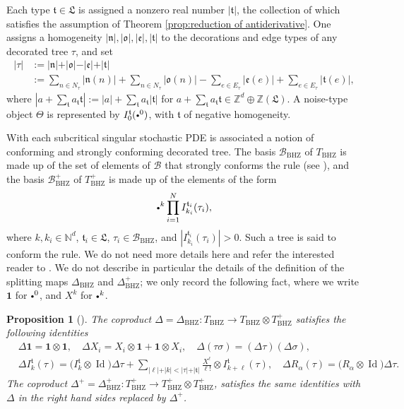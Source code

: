 \documentclass[JEP,XML,SOM,Unicode,published]{cedram}
\newcommand{\sbullet}{{\scriptscriptstyle\bullet}}
\newcommand{\scbullet}{{\raisebox{1pt}{$\sbullet$}}}
\theoremstyle{plain}
\newtheorem{prop}[thm]{Proposition}
\theoremstyle{definition}
\DeclareMathOperator{\iden}{Id}
\newcommand{\unit}{\mathbf{1}}
\newcommand{\BHZ}{{\scriptscriptstyle\mathrm{BHZ}}}
\newcommand{\bsmcB}{\boldsymbol{\mathcal{B}}}
\newcommand{\frkL}{\mathfrak{L}}
\newcommand{\frkt}{\mathfrak{t}}
\newcommand{\frkn}{\mathfrak{n}}
\newcommand{\frko}{\mathfrak{o}}
\newcommand{\frke}{\mathfrak{e}}
\newcommand{\bbN}{\mathbb{N}}
\newcommand{\bbZ}{\mathbb{Z}}
\newcommand{\mcB}{\mathcal{B}}
\begin{document}
Each type $\frkt\in\frkL$ is assigned a nonzero real number $|\frkt|$, the collection of which satisfies the assumption of Theorem \ref{prop:reduction of antiderivative}. One assigns a homogeneity $\vert\frkn\vert, \vert\frko\vert, \vert\frke\vert, \vert\frkt\vert$ to the decorations and edge types of any decorated tree $\tau$, and set
\begin{align*}
\vert\tau\vert &:= \vert\frkn\vert + \vert\frko\vert - \vert\frke\vert + \vert\frkt\vert\\
&:=\sum_{n\in N_\tau}|\frkn(n)|+\sum_{n\in N_\tau}|\frko(n)|-\sum_{e\in E_\tau}|\frke(e)|+\sum_{e\in E_\tau}|\frkt(e)|,
\end{align*}
where $|a+\sum_{\frkt}a_\frkt\frkt|:=|a|+\sum_{\frkt}a_\frkt|\frkt|$ for $a+\sum_{\frkt}a_{\frkt}\frkt\in\bbZ^d\oplus\bbZ(\frkL)$.
A noise-type object $\Theta$ is represented by $I_0^{\frkt}(\scbullet^0)$, with $\frkt$ of negative homogeneity.

With each subcritical singular stochastic PDE is associated a notion of conforming and strongly conforming decorated tree. The basis $\mcB_{\BHZ}$ of $T_{\BHZ}$ is made up of the set of elements of $\bsmcB$ that strongly conforms the rule (see \cite[\S5]{BHZ}), and the basis $\mcB_{\BHZ}^+$ of $T_{\BHZ}^+$ is made up of the elements of the form
\[
\scbullet^k\prod_{i=1}^NI_{k_i}^{\frkt_i}(\tau_i),
\]
where $k,k_i\in\bbN^d$, $\frkt_i\in\frkL$, $\tau_i\in\mcB_{\BHZ}$, and $|I_{k_i}^{\frkt_i}(\tau_i)|>0$.
Such a tree is said to conform the rule. We do not need more details here and refer the interested reader to \cite[\S5]{BHZ}. We do not describe in particular the details of the definition of the splitting maps $\Delta_\BHZ$ and $\Delta^+_\BHZ$; we only record the following fact, where we write $\unit$ for $\scbullet^0$, and $X^k$ for $\scbullet^k$.

\begin{prop}[{\cite[Prop.\,4.17]{BHZ}}]\label{recursive def of Delta}
The coproduct $\Delta=\Delta_{\BHZ}:T_\BHZ\to T_\BHZ\otimes T^+_\BHZ$ satisfies the following identities
\begin{align*}
&\Delta\unit=\unit\otimes\unit,\quad \Delta X_i=X_i\otimes\unit+\unit\otimes X_i,\quad \Delta(\tau\sigma)=(\Delta\tau)(\Delta\sigma), \\
&\Delta I_k^\frkt(\tau) = \bigl(I_k^\frkt\otimes\iden\bigr)\Delta\tau + \sum_{\vert\ell\vert+\vert k\vert <\vert \tau\vert+\vert\frkt\vert}\frac{X^\ell}{\ell!}\otimes I_{k+\ell}^\frkt(\tau),\quad
\Delta R_\alpha(\tau) = \bigl(R_\alpha\otimes\iden\bigr)\Delta\tau.
\end{align*}
The coproduct $\Delta^+=\Delta_{\BHZ}^+:T^+_\BHZ\to T^+_\BHZ\otimes T^+_\BHZ$, satisfies the same identities with $\Delta$ in the right hand sides replaced by $\Delta^+$.
\end{prop}
\end{document}
